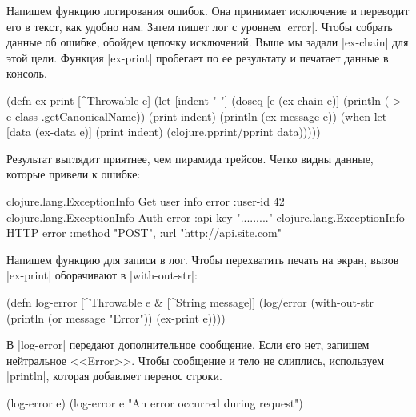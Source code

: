 Напишем функцию логирования ошибок. Она принимает исключение и переводит его в
текст, как удобно нам. Затем пишет лог с уровнем \spverb|error|. Чтобы собрать
данные об ошибке, обойдем цепочку исключений. Выше мы задали \spverb|ex-chain|
для этой цели. Функция \spverb|ex-print| пробегает по ее результату и печатает
данные в консоль.

\begin{english}
  \begin{clojure}
(defn ex-print
  [^Throwable e]
  (let [indent "  "]
    (doseq [e (ex-chain e)]
      (println (-> e class .getCanonicalName))
      (print indent)
      (println (ex-message e))
      (when-let [data (ex-data e)]
        (print indent)
        (clojure.pprint/pprint data)))))
  \end{clojure}
\end{english}

Результат выглядит приятнее, чем пирамида трейсов. Четко видны данные, которые
привели к ошибке:

\begin{english}
  \begin{clojure}
clojure.lang.ExceptionInfo
  Get user info error
  {:user-id 42}
clojure.lang.ExceptionInfo
  Auth error
  {:api-key "........."}
clojure.lang.ExceptionInfo
  HTTP error
  {:method "POST", :url "http://api.site.com"}
  \end{clojure}
\end{english}

Напишем функцию для записи в лог. Чтобы перехватить печать на экран, вызов
\spverb|ex-print| оборачивают в \spverb|with-out-str|:

\begin{english}
  \begin{clojure}
(defn log-error
  [^Throwable e & [^String message]]
  (log/error
   (with-out-str
     (println (or message "Error"))
     (ex-print e))))
  \end{clojure}
\end{english}

В \spverb|log-error| передают дополнительное сообщение. Если его нет, запишем
нейтральное <<Error>>. Чтобы сообщение и тело не слиплись, используем
\spverb|println|, которая добавляет перенос строки.

\begin{english}
  \begin{clojure}
(log-error e)
(log-error e "An error occurred during request")
  \end{clojure}
\end{english}

